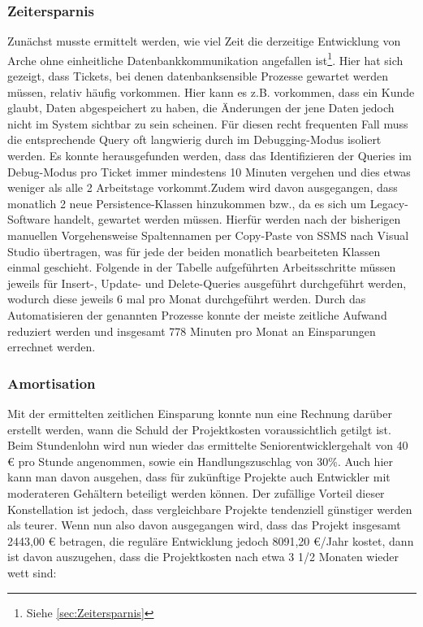 \documentclass[11pt,toc=sectionentrywithoutdots, 
headheight=44pt, headings=optiontoheadandtoc, hyperfootnotes=false, hypertexnames=false]{scrartcl}
\newcommand\extendedref[1]{Siehe \ref{#1}}
\begin{document}
\subsubsection{Zeitersparnis}
Zunächst musste ermittelt werden, wie viel Zeit die derzeitige Entwicklung von Arche ohne einheitliche Datenbankkommunikation angefallen ist\footnote{\extendedref{sec:Zeitersparnis}}. Hier hat sich gezeigt, dass Tickets, bei denen datenbanksensible Prozesse gewartet werden müssen, relativ häufig vorkommen. Hier kann es z.B. vorkommen, dass ein Kunde glaubt, Daten abgespeichert zu haben, die Änderungen der jene Daten jedoch nicht im System sichtbar zu sein scheinen. Für diesen recht frequenten Fall muss die entsprechende Query oft langwierig durch im Debugging-Modus isoliert werden. Es konnte herausgefunden werden, dass das Identifizieren der Queries im Debug-Modus pro Ticket immer mindestens 10 Minuten vergehen und dies etwas weniger als alle 2 Arbeitstage vorkommt.\newline\newline Zudem wird davon ausgegangen, dass monatlich 2 neue Persistence-Klassen hinzukommen bzw., da es sich um Legacy-Software handelt, gewartet werden müssen. Hierfür werden nach der bisherigen manuellen Vorgehensweise Spaltennamen per Copy-Paste von SSMS nach Visual Studio übertragen, was für jede der beiden monatlich bearbeiteten Klassen einmal geschieht. Folgende in der Tabelle aufgeführten Arbeitsschritte müssen jeweils für Insert-, Update- und Delete-Queries ausgeführt durchgeführt werden, wodurch diese jeweils 6 mal pro Monat durchgeführt werden. Durch das Automatisieren der genannten Prozesse konnte der meiste zeitliche Aufwand reduziert werden und insgesamt 778 Minuten pro Monat an Einsparungen errechnet werden.

\subsubsection{Amortisation}
Mit der ermittelten zeitlichen Einsparung konnte nun eine Rechnung darüber erstellt werden, wann die Schuld der Projektkosten voraussichtlich getilgt ist. Beim Stundenlohn wird nun wieder das ermittelte Seniorentwicklergehalt von 40 € pro Stunde angenommen, sowie ein Handlungszuschlag von 30\%. Auch hier kann man davon ausgehen, dass für zukünftige Projekte auch Entwickler mit moderateren Gehältern beteiligt werden können. Der zufällige Vorteil dieser Konstellation ist jedoch, dass vergleichbare Projekte tendenziell günstiger werden als teurer. Wenn nun also davon ausgegangen wird, dass das Projekt insgesamt 2443,00 € betragen, die reguläre Entwicklung jedoch 8091,20 €/Jahr kostet, dann ist davon auszugehen, dass die Projektkosten nach etwa 3 1/2 Monaten wieder wett sind:%
\end{document}

